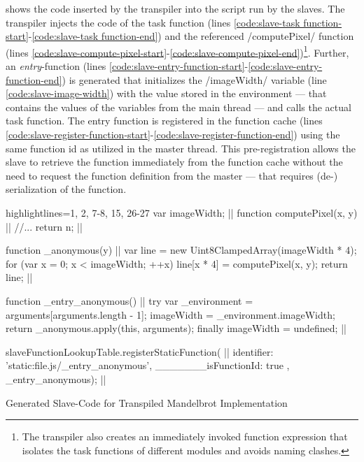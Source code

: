  shows the code inserted by the transpiler into the script run by the slaves. The transpiler injects the code of the task function (lines \ref{code:slave-task function-start}-\ref{code:slave-task function-end}) and the referenced \javascriptinline/computePixel/ function (lines \ref{code:slave-compute-pixel-start}-\ref{code:slave-compute-pixel-end})\footnote{The transpiler also creates an immediately invoked function expression that isolates the task functions of different modules and avoids naming clashes.}. Further, an \textit{entry}-function (lines \ref{code:slave-entry-function-start}-\ref{code:slave-entry-function-end}) is generated that initializes the \javascriptinline/imageWidth/ variable (line \ref{code:slave-image-width}) with the value stored in the environment --- that contains the values of the variables from the main thread --- and calls the actual task function. The entry function is registered in the function cache (lines \ref{code:slave-register-function-start}-\ref{code:slave-register-function-end}) using the same function id as utilized in the master thread. This pre-registration allows the slave to retrieve the function immediately from the function cache without the need to request the function definition from the master --- that requires (de-) serialization of the function.

\begin{listing}
\begin{javascriptcode*}{highlightlines={1, 2, 7-8, 15, 26-27}}
var imageWidth; |$\label{code:slave-image-width}$|
function computePixel(x, y) { |$\label{code:slave-compute-pixel-start}$|
	//...
	return n;
}|$\label{code:slave-compute-pixel-end}$|

function _anonymous(y) { |$\label{code:slave-task function-start}$|
	var line = new Uint8ClampedArray(imageWidth * 4);
	for (var x = 0; x < imageWidth; ++x) {
		line[x * 4] = computePixel(x, y);
	}
	return line;
}|$\label{code:slave-task function-end}$|

function _entry_anonymous() { |$\label{code:slave-entry-function-start}$|
	try {
		var _environment = arguments[arguments.length - 1];
		imageWidth = _environment.imageWidth;
		return _anonymous.apply(this, arguments);
	} finally {
		imageWidth = undefined;
	}
}|$\label{code:slave-entry-function-end}$|

slaveFunctionLookupTable.registerStaticFunction({ |$\label{code:slave-register-function-start}$|
	identifier: 'static:file.js/_entry_anonymous',
	_______isFunctionId: true
}, _entry_anonymous); |$\label{code:slave-register-function-end}$|
\end{javascriptcode*}
\caption{Generated Slave-Code for Transpiled Mandelbrot Implementation}
\label{fig:transpiled-mandelbrot-slave}
\end{listing}

